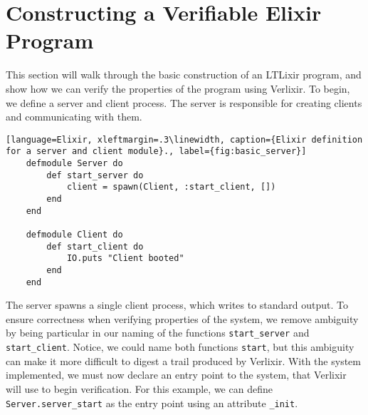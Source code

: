 \section{Constructing a Verifiable Elixir Program} \label{sec:verifiable}
This section will walk through the basic construction of an LTLixir program, and show how we can verify the properties of the program using Verlixir. To begin, we define a server and client process. The server is responsible for creating clients and communicating with them. 
\begin{lstlisting}[language=Elixir, xleftmargin=.3\linewidth, caption={Elixir definition for a server and client module}., label={fig:basic_server}]
    defmodule Server do
        def start_server do
            client = spawn(Client, :start_client, [])
        end
    end

    defmodule Client do
        def start_client do
            IO.puts "Client booted"
        end
    end
\end{lstlisting}
The server spawns a single client process, which writes to standard output. To ensure correctness when verifying properties of the system, we remove ambiguity by being particular in our naming of the functions \texttt{start\_server} and \texttt{start\_client}. Notice, we could name both functions \texttt{start}, but this ambiguity can make it more difficult to digest a trail produced by Verlixir. With the system implemented, we must now declare an entry point to the system, that Verlixir will use to begin verification. For this example, we can define \texttt{Server.server\_start} as the entry point using an attribute \texttt{\@vae\_init}.

